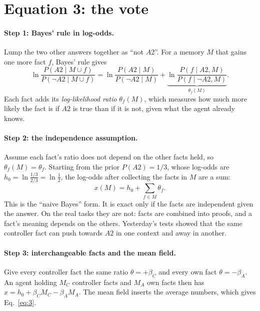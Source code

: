 \documentclass[10pt,a4paper]{article}
\begin{document}
\section{Equation 3: the vote}
\label{sec:eq3}
\paragraph{Step 1: Bayes' rule in log-odds.} Lump the two other answers together as ``not $A2$''. For a memory $M$ that
gains one more fact $f$, Bayes' rule gives
\begin{equation}
\ln\frac{P(A2\mid M\cup f)}{P(\neg A2\mid M\cup f)}=\ln\frac{P(A2\mid M)}{P(\neg A2\mid M)}
+\underbrace{\ln\frac{P(f\mid A2,M)}{P(f\mid\neg A2,M)}}_{\theta_f(M)} .\label{eq:bayes}
\end{equation}
Each fact adds its \emph{log-likelihood ratio} $\theta_f(M)$, which measures how much more likely the fact is if $A2$ is
true than if it is not, given what the agent already knows.

\paragraph{Step 2: the independence assumption.} Assume each fact's ratio does not depend on the other facts held, so
$\theta_f(M)=\theta_f$. Starting from the prior $P(A2)=1/3$, whose log-odds are $h_0=\ln\frac{1/3}{2/3}=\ln\frac12$, the
log-odds after collecting the facts in $M$ are a sum:
\begin{equation}
x(M)=h_0+\sum_{f\in M}\theta_f .
\end{equation}
This is the ``naive Bayes'' form. It is exact only if the facts are independent given the answer. On the real tasks they
are not: facts are combined into proofs, and a fact's meaning depends on the others. Yesterday's tests showed that
the same controller fact can push towards $A2$ in one context and away in another.

\paragraph{Step 3: interchangeable facts and the mean field.} Give every controller fact the same ratio $\theta=+\beta_C$
and every own fact $\theta=-\beta_A$. An agent holding $M_C$ controller facts and $M_A$ own facts then has
$x=h_0+\beta_C M_C-\beta_A M_A$. The mean field inserts the average numbers, which gives Eq.~\eqref{eq:3}.
\end{document}
